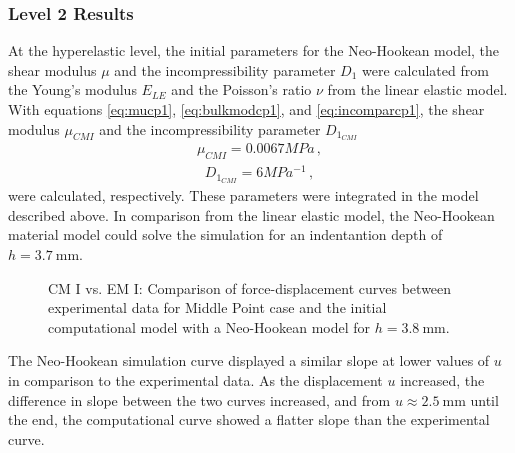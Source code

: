 \subsubsection*{Level 2 Results}
\label{subsection:level2cmI}
At the hyperelastic level, the initial parameters for the Neo-Hookean model, 
the shear modulus $\mu$ and the incompressibility parameter $D_1$ were calculated from the Young's modulus $E_{LE}$
and the Poisson's ratio $\nu$ from the linear elastic model. With equations \ref{eq:mucp1}, \ref{eq:bulkmodcp1}, 
and \ref{eq:incomparcp1}, the shear modulus $\mu_{CMI}$ and the incompressibility parameter $D_{1_{CMI}}$
\begin{align}
    \mu_{CMI} = 0.0067 MPa \, ,
    \label{eq:mucp1result}
\end{align}
\begin{align}
    D_{1_{CMI}} = 6 MPa^{-1} \, ,
    \label{eq:d1cp1result}
\end{align}
were calculated, respectively. These parameters were integrated in the model described above. In comparison from 
the linear elastic model, the Neo-Hookean material model could solve the simulation for an indentantion depth of 
$h =  \SI{3.7}{\milli \meter}$.
\begin{figure}%
    \centering
   \quad
   \caption[Computational model I vs. Experimental data - Neo-Hookean]{CM I vs. EM I: Comparison of force-displacement curves between experimental data for Middle Point case and the initial computational model with a Neo-Hookean model for $h = \SI{3.8}{\milli \meter}$.}%
   \label{fig:MPIvsCPINH}%
\end{figure}
The Neo-Hookean simulation curve displayed a similar slope at lower values of $u$ in comparison to the experimental data.
As the displacement $u$ increased, the difference in slope between the two curves increased, and from $u \approx \SI{2.5}{\milli \meter}$
until the end, the computational curve showed a flatter slope than the experimental curve.\\

